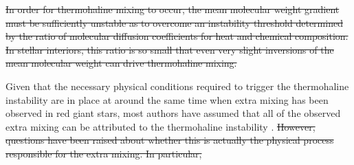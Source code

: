 \sout{In order for thermohaline mixing to occur, the mean molecular weight gradient must be sufficiently unstable as to overcome an instability threshold determined by the ratio of molecular diffusion coefficients for heat and chemical composition. 
In stellar interiors, this ratio is so small that even very slight inversions of the mean molecular weight can drive thermohaline mixing.}






Given that the necessary physical conditions required to trigger the thermohaline instability are in place at around the same time when extra mixing has been observed in red giant stars, 
most authors have assumed that all of the observed extra mixing can be attributed to the thermohaline instability \citep[e.g.][]{Kirby2016, Charbonnel2020, Magrini2021a}. %
\sout{However, questions have been raised about whether this is actually the physical process responsible for the extra mixing. In particular,} 

